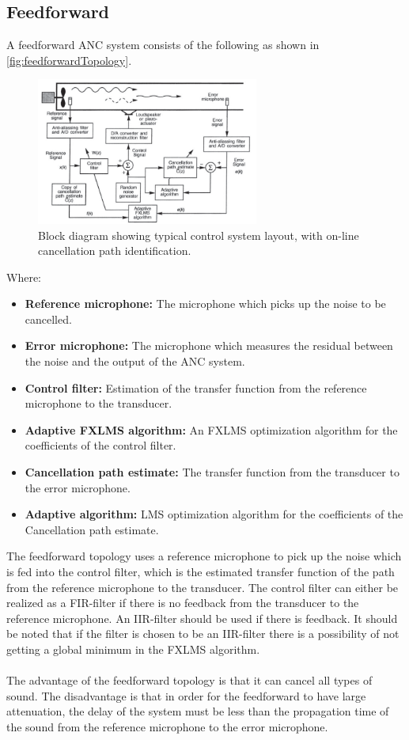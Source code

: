 \subsection{Feedforward}
A feedforward ANC system consists of the following as shown in \autoref{fig:feedforwardTopology}.
\begin{figure}[H]
	\centering
	\includegraphics[width=0.65\textwidth]{figures/BasicSystem/feedforward}
	\caption{Block diagram showing typical control system layout, with on-line cancellation path identification. \cite{Hansen2}}
	\label{fig:feedforwardTopology}
\end{figure}
Where:
\begin{itemize}
\item \textbf{Reference microphone:} The microphone which picks up the noise to be cancelled.
\item \textbf{Error microphone:} The microphone which measures the residual between the noise and the output of the ANC system.
\item \textbf{Control filter:} Estimation of the transfer function from the reference microphone to the transducer. 
\item \textbf{Adaptive FXLMS algorithm:} An FXLMS optimization algorithm for the coefficients of the control filter.
\item \textbf{Cancellation path estimate:} The transfer function from the transducer to the error microphone.
\item \textbf{Adaptive algorithm:} LMS optimization algorithm for the coefficients of the Cancellation path estimate.
\end{itemize}

The feedforward topology uses a reference microphone to pick up the noise which is fed into the control filter, which is the estimated transfer function of the path from the reference microphone to the transducer. The control filter can either be realized as a FIR-filter if there is no feedback from the transducer to the reference microphone. An IIR-filter should be used if there is feedback. It should be noted that if the filter is chosen to be an IIR-filter there is a possibility of not getting a global minimum in the FXLMS algorithm.
\\\\
The advantage of the feedforward topology is that it can cancel all types of sound. The disadvantage is that in order for the feedforward to have large attenuation, the delay of the system must be less than the propagation time of the sound from the reference microphone to the error microphone.    




